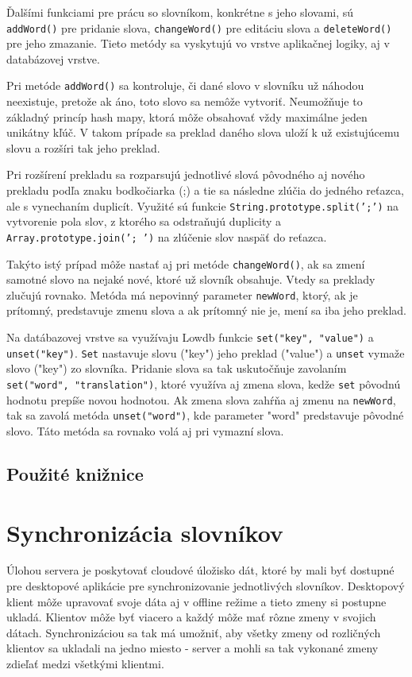 \documentclass[
  digital, %
  table,   %
  lof,     %
  lot,     %
]{fithesis3}
\begin{document}
Ďalšími funkciami pre prácu so slovníkom, konkrétne s jeho slovami, sú \texttt{addWord()} pre pridanie slova, \texttt{changeWord()} pre editáciu slova a \texttt{deleteWord()} pre jeho zmazanie. Tieto metódy sa vyskytujú vo vrstve aplikačnej logiky, aj v databázovej vrstve.

Pri metóde \texttt{addWord()} sa kontroluje, či dané slovo v slovníku už náhodou neexistuje, pretože ak áno, toto slovo sa nemôže vytvoriť. Neumožňuje to základný princíp hash mapy, ktorá môže obsahovať vždy maximálne jeden unikátny kľúč. V takom prípade sa preklad daného slova uloží k už existujúcemu slovu a rozšíri tak jeho preklad.

Pri rozšírení prekladu sa rozparsujú jednotlivé slová pôvodného aj nového prekladu podľa znaku bodkočiarka (;) a tie sa následne zlúčia do jedného reťazca, ale s vynechaním duplicít. Využité sú funkcie \texttt{String.prototype.split(';')} na vytvorenie pola slov, z ktorého sa odstraňujú duplicity a \texttt{Array.prototype.join('; ')} na zlúčenie slov naspäť do reťazca.

Takýto istý prípad môže nastať aj pri metóde \texttt{changeWord()}, ak sa zmení samotné slovo na nejaké nové, ktoré už slovník obsahuje. Vtedy sa preklady zlučujú rovnako. Metóda má nepovinný parameter \texttt{newWord}, ktorý, ak je prítomný, predstavuje zmenu slova a ak prítomný nie je, mení sa iba jeho preklad.

Na datábazovej vrstve sa využívaju Lowdb funkcie \texttt{set("key", "value")} a \texttt{unset("key")}. \texttt{Set} nastavuje slovu ("key") jeho preklad ("value") a \texttt{unset} vymaže slovo ("key") zo slovníka. Pridanie slova sa tak uskutočňuje zavolaním \texttt{set("word", "translation")}, ktoré využíva aj zmena slova, kedže \texttt{set} pôvodnú hodnotu prepíše novou hodnotou. Ak zmena slova zahŕňa aj zmenu na \texttt{newWord}, tak sa zavolá metóda \texttt{unset("word")}, kde parameter "word" predstavuje pôvodné slovo. Táto metóda sa rovnako volá aj pri vymazní slova.

\subsection{Použité knižnice}


\section{Synchronizácia slovníkov}
Úlohou servera je poskytovať cloudové úložisko dát, ktoré by mali byť dostupné pre desktopové aplikácie pre synchronizovanie jednotlivých slovníkov. Desktopový klient môže upravovať svoje dáta aj v offline režime a tieto zmeny si postupne ukladá. Klientov môže byť viacero a každý môže mať rôzne zmeny v svojich dátach. Synchronizáciou sa tak má umožniť, aby všetky zmeny od rozličných klientov sa ukladali na jedno miesto - server a mohli sa tak vykonané zmeny zdieľať medzi všetkými klientmi.
\end{document}
